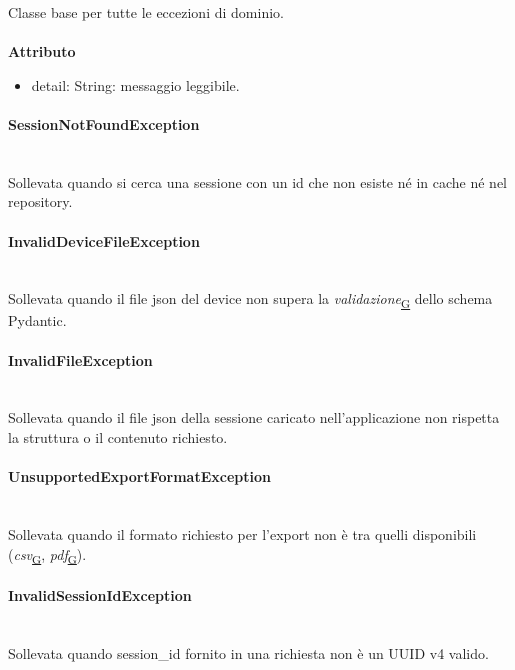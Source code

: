 \documentclass[a4paper,12pt]{article}
\begin{document}
                    Classe base per tutte le eccezioni di dominio.\\\\
                    \textbf{Attributo}
                    \begin{itemize}
                        \item {\ttfamily detail: String}: messaggio leggibile.
                    \end{itemize}

                \paragraph{SessionNotFoundException}\mbox{}\\
                    Sollevata quando si cerca una sessione con un id che non esiste né in cache né nel repository.

                \paragraph{InvalidDeviceFileException}\mbox{}\\
                    Sollevata quando il file json del device non supera la \textit{validazione}\textsubscript{\href{https://atlasteam9.github.io/Atlas/glossario.html\#Validazione}{G}} dello schema Pydantic.

                \paragraph{InvalidFileException}\mbox{}\\
                    Sollevata quando il file json della sessione caricato nell'applicazione non rispetta la struttura o il contenuto richiesto.

                \paragraph{UnsupportedExportFormatException}\mbox{}\\
                    Sollevata quando il formato richiesto per l'export non è tra quelli disponibili (\textit{csv}\textsubscript{\href{https://atlasteam9.github.io/Atlas/glossario.html\#CSV}{G}}, \textit{pdf}\textsubscript{\href{https://atlasteam9.github.io/Atlas/glossario.html\#PDF}{G}}).

                \paragraph{InvalidSessionIdException}\mbox{}\\
                    Sollevata quando session\_id fornito in una richiesta non è un UUID v4 valido.
                    
\end{document}
